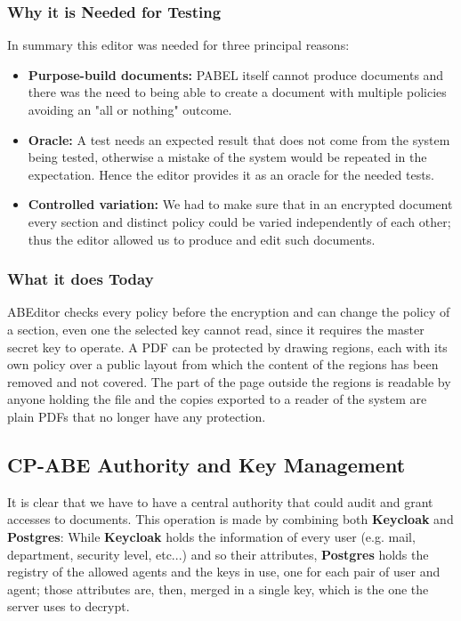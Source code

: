 \subsubsection{Why it is Needed for Testing}
In summary this editor was needed for three principal reasons:
\begin{itemize}
  \item \textbf{Purpose-build documents:} PABEL itself cannot produce documents and there was the need to being able to create a document with multiple policies avoiding an "all or nothing" outcome.
  \item \textbf{Oracle:} A test needs an expected result that does not come from the system being tested, otherwise a mistake of the system would be repeated in the expectation. Hence the editor provides it as an oracle for the needed tests.
  \item \textbf{Controlled variation:} We had to make sure that in an encrypted document every section and distinct policy could be varied independently of each other; thus the editor allowed us to produce and edit such documents.
\end{itemize}

\subsubsection{What it does Today}
ABEditor checks every policy before the encryption and can change the policy of a section, even one the selected key cannot read, since it requires the master secret key to operate.
A PDF can be protected by drawing regions, each with its own policy over a public layout from which the content of the regions has been removed and not covered.
The part of the page outside the regions is readable by anyone holding the file and the copies exported to a reader of the system are plain PDFs that no longer have any protection.

\subsection{CP-ABE Authority and Key Management}\label{CP-ABE Authority and Key Management}
It is clear that we have to have a central authority that could audit and grant accesses to documents. This operation is made by combining both \textbf{Keycloak} and \textbf{Postgres}:
While \textbf{Keycloak} holds the information of every user (e.g. mail, department, security level, etc...) and so their attributes, \textbf{Postgres} holds the registry of the allowed agents and the keys in use, one for each pair of user and agent; those attributes are, then, merged in a single key, which is the one the server uses to decrypt.

